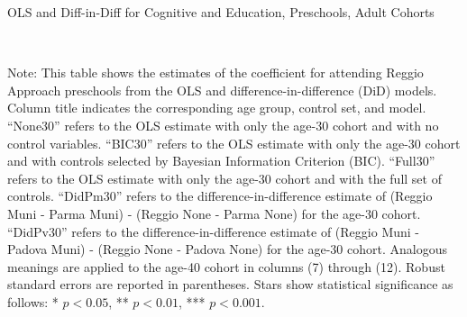 \documentclass[12pt]{article}
\begin{document}

\begin{landscape}
\singlespacing

\begin{table}[H] \caption{OLS and Diff-in-Diff for Cognitive and Education, Preschools, Adult Cohorts} \label{ols-E-reg}
\scalebox{0.80}{}
\vspace{1ex} \\
\footnotesize\raggedright{Note: This table shows the estimates of the coefficient for attending Reggio Approach preschools from the OLS and difference-in-difference (DiD) models. Column title indicates the corresponding age group, control set, and model. ``None30'' refers to the OLS estimate with only the age-30 cohort and with no control variables. ``BIC30'' refers to the OLS estimate with only the age-30 cohort and with controls selected by Bayesian Information Criterion (BIC). ``Full30'' refers to the OLS estimate with only the age-30 cohort and with the full set of controls. ``DidPm30'' refers to the difference-in-difference estimate of (Reggio Muni - Parma Muni) - (Reggio None - Parma None) for the age-30 cohort. ``DidPv30'' refers to the difference-in-difference estimate of (Reggio Muni - Padova Muni) - (Reggio None - Padova None) for the age-30 cohort.  Analogous meanings are applied to the age-40 cohort in columns (7) through (12). Robust standard errors are reported in parentheses. Stars show statistical significance as follows: * $p < 0.05$, ** $p < 0.01$, *** $p < 0.001$.}
\end{table}


\end{landscape}
\end{document}
